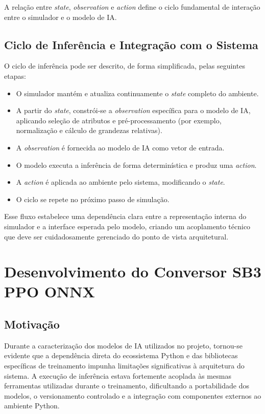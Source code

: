 A relação entre \textit{state}, \textit{observation} e \textit{action} define o ciclo fundamental de interação entre o simulador e o modelo de IA.


\subsection{Ciclo de Inferência e Integração com o Sistema}

O ciclo de inferência pode ser descrito, de forma simplificada, pelas seguintes etapas:
\begin{itemize}
    \item O simulador mantém e atualiza continuamente o \textit{state} completo do ambiente.
    \item A partir do \textit{state}, constrói-se a \textit{observation} específica para o modelo de IA, aplicando seleção de atributos e pré-processamento (por exemplo, normalização e cálculo de grandezas relativas).
    \item A \textit{observation} é fornecida ao modelo de IA como vetor de entrada.
    \item O modelo executa a inferência de forma determinística e produz uma \emph{action}.
    \item A \textit{action} é aplicada ao ambiente pelo sistema, modificando o \textit{state}.
    \item O ciclo se repete no próximo passo de simulação.
\end{itemize}

Esse fluxo estabelece uma dependência clara entre a representação interna do simulador e a interface esperada pelo modelo, criando um acoplamento técnico que deve ser cuidadosamente gerenciado do ponto de vista arquitetural.


\section{Desenvolvimento do Conversor SB3 PPO \textrightarrow{} ONNX}

\subsection{Motivação}

Durante a caracterização dos modelos de IA utilizados no projeto, tornou-se evidente que a dependência direta do ecossistema Python e das bibliotecas específicas de treinamento impunha limitações significativas à arquitetura do sistema. A execução de inferência estava fortemente acoplada às mesmas ferramentas utilizadas durante o treinamento, dificultando a portabilidade dos modelos, o versionamento controlado e a integração com componentes externos ao ambiente Python.

